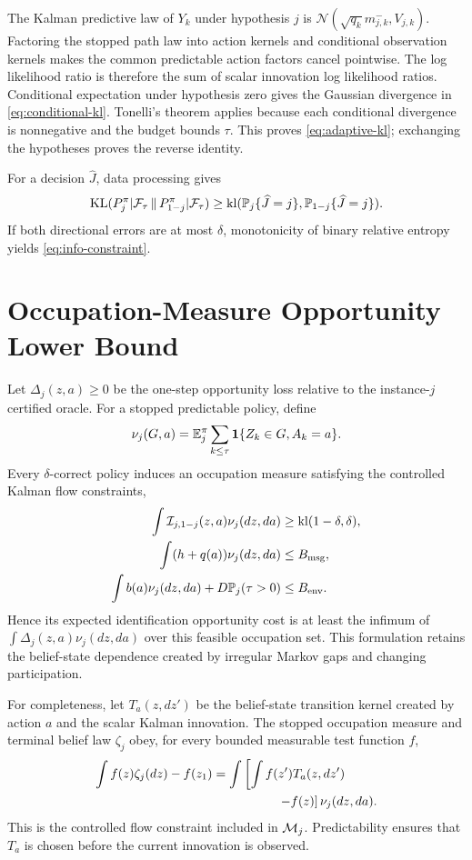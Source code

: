 The Kalman predictive law of $Y_k$ under hypothesis $j$ is $\mathcal{N}(\sqrt{q_k}m^-_{j,k},V_{j,k})$.
Factoring the stopped path law into action kernels and conditional observation kernels makes the common predictable action factors cancel pointwise.
The log likelihood ratio is therefore the sum of scalar innovation log likelihood ratios.
Conditional expectation under hypothesis zero gives the Gaussian divergence in \eqref{eq:conditional-kl}.
Tonelli's theorem applies because each conditional divergence is nonnegative and the budget bounds $\tau$.
This proves \eqref{eq:adaptive-kl}; exchanging the hypotheses proves the reverse identity.

For a decision $\widehat J$, data processing gives
\begin{equation}
\operatorname{KL}(P_j^\pi|\mathcal{F}_\tau\,\|\,P_{1-j}^\pi|\mathcal{F}_\tau)\ge\operatorname{kl}(\mathbb{P}_j\{\widehat J=j\},\mathbb{P}_{1-j}\{\widehat J=j\}).
\end{equation}
If both directional errors are at most $\delta$, monotonicity of binary relative entropy yields \eqref{eq:info-constraint}.

\section{Occupation-Measure Opportunity Lower Bound}
Let $\Delta_j(z,a)\ge0$ be the one-step opportunity loss relative to the instance-$j$ certified oracle.
For a stopped predictable policy, define
\begin{equation}
\nu_j(G,a)=\mathbb{E}_j^\pi\sum_{k\le\tau}\mathbf{1}\{Z_k\in G,A_k=a\}.
\end{equation}
Every $\delta$-correct policy induces an occupation measure satisfying the controlled Kalman flow constraints,
\begin{align}
\int\mathcal{I}_{j,1-j}(z,a)\nu_j(dz,da)&\ge\operatorname{kl}(1-\delta,\delta),\nonumber\\
\int(h+q(a))\nu_j(dz,da)&\le B_{\rm msg},\nonumber\\
\int b(a)\nu_j(dz,da)+D\mathbb{P}_j(\tau>0)&\le B_{\rm env}.
\end{align}
Hence its expected identification opportunity cost is at least the infimum of $\int\Delta_j(z,a)\nu_j(dz,da)$ over this feasible occupation set.
This formulation retains the belief-state dependence created by irregular Markov gaps and changing participation.

For completeness, let $T_a(z,dz')$ be the belief-state transition kernel created by action $a$ and the scalar Kalman innovation.
The stopped occupation measure and terminal belief law $\zeta_j$ obey, for every bounded measurable test function $f$,
\begin{align}
\int f(z)\zeta_j(dz)-f(z_1)
&=\int\left[\int f(z')T_a(z,dz')\right.\nonumber\\
&\left.\hspace{18mm}-f(z)\right]\nu_j(dz,da).
\label{eq:belief-flow}
\end{align}
This is the controlled flow constraint included in ${\cal M}_j$.
Predictability ensures that $T_a$ is chosen before the current innovation is observed.

